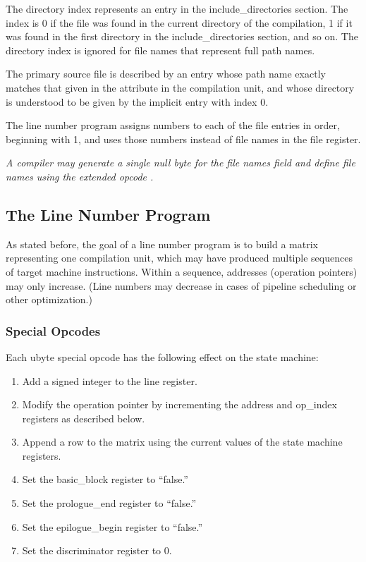 \begin{enumerate}[1.]
The directory index represents an entry in the
include\_directories section. The index is 0 if the file was
found in the current directory of the compilation, 1 if it
was found in the first directory in the include\_directories
section, and so on. The directory index is ignored for file
names that represent full path names.

The primary source file is described by an entry whose path
name exactly matches that given in the  attribute
in the compilation unit, and whose directory is understood
to be given by the implicit entry with index 0.

The line number program assigns numbers to each of the file
entries in order, beginning with 1, and uses those numbers
instead of file names in the file register.

\textit{A compiler may generate a single null byte for the file
names field and define file names using the extended opcode
.}


\end{enumerate}

\subsection{The Line Number Program}

As stated before, the goal of a line number program is to build
a matrix representing one compilation unit, which may have
produced multiple sequences of target machine instructions.
Within a sequence, addresses (operation pointers) may only
increase. (Line numbers may decrease in cases of pipeline
scheduling or other optimization.)

\subsubsection{Special Opcodes} 
\label{chap:specialopcodes}
Each ubyte special opcode has the following effect on the state machine:

\begin{enumerate}[1.]

\item  Add a signed integer to the line register.

\item  Modify the operation pointer by incrementing the
address and op\_index registers as described below.

\item  Append a row to the matrix using the current values
of the state machine registers.

\item  Set the basic\_block register to ``false.''
\item  Set the prologue\_end register to ``false.''
\item  Set the epilogue\_begin register to ``false.''
\item  Set the discriminator register to 0.

\end{enumerate}

